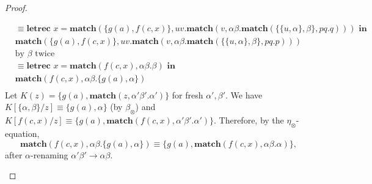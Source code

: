 \begin{example}
\begin{proof}
\begin{itemize}
\begin{align*}
&\equiv \textbf{letrec } x = \textbf{match}(\{g(a),f(c,x)\}, uv.\textbf{match}(v,\alpha\beta.\textbf{match}(\{\{u,\alpha\}, \beta\}, pq.q))) \textbf{ in }\\
&\textbf{match}(\{g(a),f(c,x)\}, uv.\textbf{match}(v,\alpha\beta.\textbf{match}(\{\{u,\alpha\}, \beta\}, pq.p)))\\
&\text{by $\beta$ twice}\\
&\equiv \textbf{letrec } x = \textbf{match}(f(c,x), \alpha\beta.\beta) \textbf{ in }\\
&\textbf{match}(f(c,x),\alpha\beta.\{g(a), \alpha\})\\
\end{align*}
Let $K(z) = \{g(a), \textbf{match}(z, \alpha'\beta'.\alpha')\}$ for fresh $\alpha', \beta'$.
We have $K[\{\alpha,\beta\}/z] \equiv \{g(a), \alpha\}$ (by $\beta_\otimes$) and 
$K[f(c,x)/z] \equiv \{g(a), \textbf{match}(f(c,x), \alpha'\beta'.\alpha')\}$.
Therefore, by the $\eta_\otimes$-equation,
\[
\textbf{match}(f(c,x), \alpha\beta.\{g(a), \alpha\}) \equiv \{g(a), \textbf{match}(f(c,x), \alpha\beta.\alpha)\},
\]
\textnormal{after $\alpha$-renaming $\alpha'\beta' \to \alpha\beta$.}


\end{itemize}
\end{proof}
\end{example}
